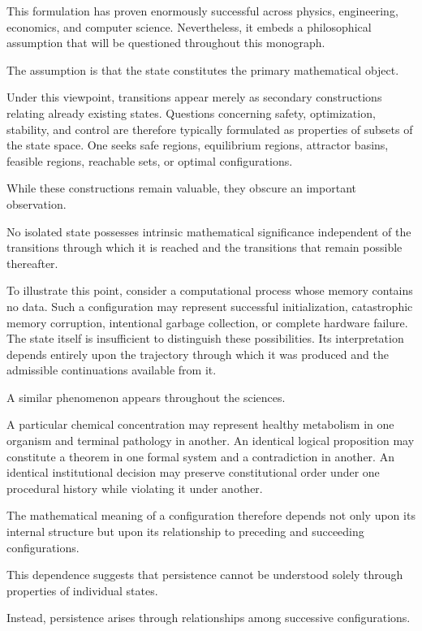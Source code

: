 \documentclass[11pt]{book}
\numberwithin{equation}{chapter}
\theoremstyle{definition}
\theoremstyle{plain}
\begin{document}
This formulation has proven enormously successful across physics, engineering, economics, and computer science. Nevertheless, it embeds a philosophical assumption that will be questioned throughout this monograph.

The assumption is that the state constitutes the primary mathematical object.

Under this viewpoint, transitions appear merely as secondary constructions relating already existing states. Questions concerning safety, optimization, stability, and control are therefore typically formulated as properties of subsets of the state space. One seeks safe regions, equilibrium regions, attractor basins, feasible regions, reachable sets, or optimal configurations.

While these constructions remain valuable, they obscure an important observation.

No isolated state possesses intrinsic mathematical significance independent of the transitions through which it is reached and the transitions that remain possible thereafter.

To illustrate this point, consider a computational process whose memory contains no data. Such a configuration may represent successful initialization, catastrophic memory corruption, intentional garbage collection, or complete hardware failure. The state itself is insufficient to distinguish these possibilities. Its interpretation depends entirely upon the trajectory through which it was produced and the admissible continuations available from it.

A similar phenomenon appears throughout the sciences.

A particular chemical concentration may represent healthy metabolism in one organism and terminal pathology in another. An identical logical proposition may constitute a theorem in one formal system and a contradiction in another. An identical institutional decision may preserve constitutional order under one procedural history while violating it under another.

The mathematical meaning of a configuration therefore depends not only upon its internal structure but upon its relationship to preceding and succeeding configurations.

This dependence suggests that persistence cannot be understood solely through properties of individual states.

Instead, persistence arises through relationships among successive configurations.
\end{document}
